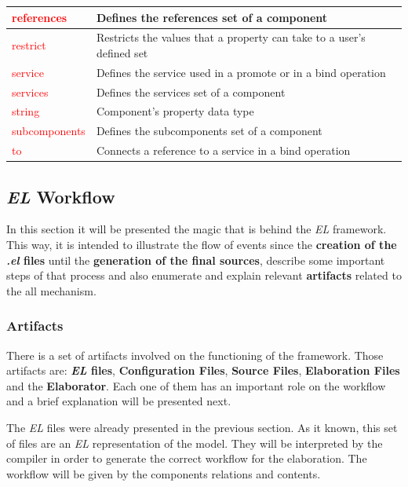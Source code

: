 \documentclass[12pt]{article}
\newcounter{subsubsubsection}[subsubsection]
\begin{document}
{\begin{table}[H]
{\begin{tabular}{|l|l|}
		\textcolor{red}{references}               & Defines the references set of a component \\ \hline
		\textcolor{red}{restrict}                 & Restricts the values that a property can take to a user's defined set  \\ \hline
		\textcolor{red}{service}                  & Defines the service used in a promote or in a bind operation \\ \hline
		\textcolor{red}{services}                 & Defines the services set of a component  \\ \hline
		\textcolor{red}{string}                   & Component's property data type \\ \hline
		\textcolor{red}{subcomponents}            & Defines the subcomponents set of a component  \\ \hline
		\textcolor{red}{to}                       & Connects a reference to a service in a bind operation \\ \hline
	\end{tabular} }
\end{table} 



\subsection{\textit{EL} Workflow}

In this section it will be presented the magic that is behind the \textit{EL} framework. This way, it is intended to illustrate the flow of events since the \textbf{creation of the \textit{.el} files} until the \textbf{generation of the final sources}, describe some important steps of that process and also enumerate and explain relevant \textbf{artifacts} related to the all mechanism.

\subsubsection{Artifacts}

There is a set of artifacts involved on the functioning of the framework. Those artifacts are: \textbf{\textit{EL} files}, \textbf{Configuration Files}, \textbf{Source Files}, \textbf{Elaboration Files} and the \textbf{Elaborator}. Each one of them has an important role on the workflow and a brief explanation will be presented next.


The \textit{EL} files were already presented in the previous section. As it known, this set of files are an \textit{EL} representation of the model. They will be interpreted by the compiler in order to generate the correct workflow for the elaboration. The workflow will be given by the
components relations and contents.

}
\end{document}
